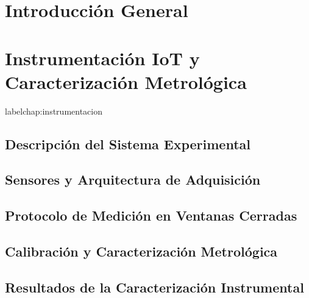 \documentclass[10pt,spanish,fleqn,openany,twoside,letterpaper]{book}
\begin{document}
\chapter{Introducción General}








\chapter{Instrumentación IoT y Caracterización Metrológica}
label{chap:instrumentacion}


\section{Descripción del Sistema Experimental}
\label{sec:cap2_sistema_experimental}


\section{Sensores y Arquitectura de Adquisición}
\label{sec:cap2_sensores}


\section{Protocolo de Medición en Ventanas Cerradas}
\label{sec:cap2_protocolo}


\section{Calibración y Caracterización Metrológica}
\label{sec:cap2_calibracion}


\section{Resultados de la Caracterización Instrumental}
\label{sec:cap2_resultados}

\end{document}
